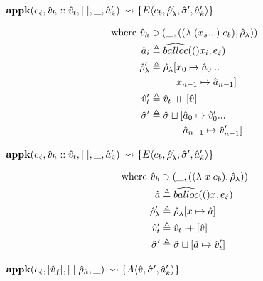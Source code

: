 \documentclass[12pt,draft]{article}
\newcommand\mdoubleplus{\ensuremath{\mathbin{+\mkern-9mu+}}}
\newcommand{\lamsyn}[2]{(\lambda\;(#1 ...)\;#2)}
\newcommand{\vararglamsyn}[2]{(\lambda\;#1\;#2)}
\begin{document}
\begin{multicols*}{2}
\vfill\null
\columnbreak


\begin{center}
  $\textbf{appk}(e_{\hat{\varsigma}}, \hat{v}_h::\hat{v}_t , [\;] , \_ , \hat{a}_{\hat{\kappa}}')$
  $\leadsto \{E\langle e_b , \hat{\rho}_{\lambda}' , \hat{\sigma}' , \hat{a}_{\hat{\kappa}}' \rangle\}$
\end{center}
\vspace{-7mm}
\begin{align*}
  \text{where }
  \aval_h &\ni (\_ , (\lamsyn{x_s}{e_b} , \aenv_{\lambda})) \\
  \abaddr_i &\triangleq \aballoc(x_i , \ectrl) \\
  \aenv_{\lambda}' &\triangleq \aenv_{\lambda}[x_0 \mapsto \abaddr_0 ... \\
          &\;\;\;\;\;\;\;\;\;\,x_{n-1} \mapsto \abaddr_{n-1}] \\
  \aval_t' &\triangleq \aval_t \mdoubleplus [\aval] \\
  \astore' &\triangleq \astore \sqcup [\abaddr_0 \mapsto \aval_0' ... \\
          &\;\;\;\;\;\;\;\;\;\;\;\;\abaddr_{n-1} \mapsto \aval_{n-1}']
\end{align*}
\begin{center}
  $\textbf{appk}(e_{\hat{\varsigma}}, \hat{v}_h::\hat{v}_t , [\;] , \_ , \hat{a}_{\hat{\kappa}}')$
  $\leadsto \{E\langle e_b , \hat{\rho}_{\lambda}' , \hat{\sigma}' , \hat{a}_{\hat{\kappa}}' \rangle\}$
\end{center}
\vspace{-7mm}
\begin{align*}
  \text{where }
  \aval_h &\ni (\_ , (\vararglamsyn{x}{e_b} , \aenv_{\lambda})) \\
  \abaddr &\triangleq \aballoc(x , \ectrl) \\
  \aenv_{\lambda}' &\triangleq \aenv_{\lambda}[x \mapsto \abaddr] \\
  \aval_t' &\triangleq \aval_t \mdoubleplus [\aval] \\
  \astore' &\triangleq \astore \sqcup [\abaddr \mapsto \aval_t']
\end{align*}
\begin{center}
  $\textbf{appk}(e_{\hat{\varsigma}} , [\hat{v}_f] , [\;] . \hat{\rho}_{\hat{\kappa}} , \_)$
  $\leadsto \{A\langle \hat{v} , \hat{\sigma}' , \hat{a}_{\hat{\kappa}}' \rangle\}$

\end{center}
\end{multicols*}
\end{document}
